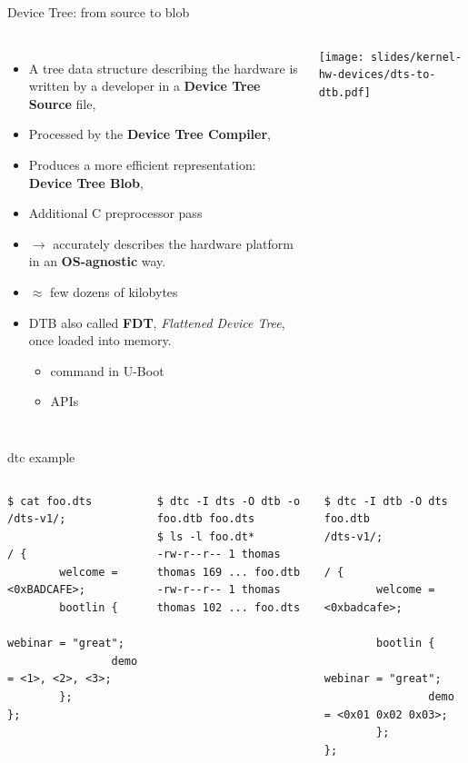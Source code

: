 \begin{frame}{Device Tree: from source to blob}
  \begin{columns}
    \begin{itemize}
    \item A tree data structure describing the hardware is written by a
      developer in a {\bf Device Tree Source} file, 
    \item Processed by the {\bf Device Tree Compiler}, 
    \item Produces a more efficient representation: {\bf Device Tree
        Blob}, 
    \item Additional C preprocessor pass
    \item {} $\rightarrow$ accurately describes the hardware platform in an {\bf OS-agnostic} way.
    \item {} $\approx$ few dozens of kilobytes
    \item DTB also called {\bf FDT}, {\em Flattened Device Tree}, once
      loaded into memory.
      \begin{itemize}
      \item {} command in U-Boot
      \item {} APIs
      \end{itemize}
    \end{itemize}
    \texttt{[image: slides/kernel-hw-devices/dts-to-dtb.pdf]}
  \end{columns}
\end{frame}

\begin{frame}[fragile]{dtc example}
  \footnotesize
  \begin{columns}[t]
    \begin{block}{}
\begin{verbatim}
$ cat foo.dts
/dts-v1/;

/ {
        welcome = <0xBADCAFE>;
        bootlin {
                webinar = "great";
                demo = <1>, <2>, <3>;
        };
};
\end{verbatim}
    \end{block}
    \pause
    \begin{block}{}
\begin{verbatim}
$ dtc -I dts -O dtb -o foo.dtb foo.dts
$ ls -l foo.dt*
-rw-r--r-- 1 thomas thomas 169 ... foo.dtb
-rw-r--r-- 1 thomas thomas 102 ... foo.dts
\end{verbatim}
    \end{block}
    \pause
    \begin{block}{}
\begin{verbatim}
$ dtc -I dtb -O dts foo.dtb
/dts-v1/;

/ {
        welcome = <0xbadcafe>;

        bootlin {
                webinar = "great";
                demo = <0x01 0x02 0x03>;
        };
};
\end{verbatim}
    \end{block}
  \end{columns}
\end{frame}


